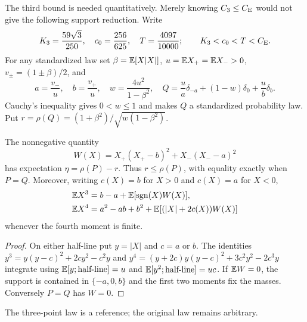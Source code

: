 The third bound is needed quantitatively.  Merely knowing $C_3\le C_{\mathrm E}$
would not give the following support reduction.
Write
\[
 K_3=\frac{59\sqrt3}{250},\quad c_0=\frac{256}{625},\quad
 T=\frac{4097}{10000};\qquad K_3<c_0<T<C_{\mathrm E}.
\]
For any standardized law set
$\beta=\mathbb E[X|X|]$, $u=\mathbb E X_+=\mathbb E X_->0$,
$v_\pm=(1\pm\beta)/2$, and
\begin{equation}\label{j:finite:n4-reference}
 a=\frac{v_-}{u},\quad b=\frac{v_+}{u},\quad
 w=\frac{4u^2}{1-\beta^2},\quad
 Q=\frac ua\delta_{-a}+(1-w)\delta_0+\frac ub\delta_b.
\end{equation}
Cauchy's inequality gives $0<w\le1$ and makes $Q$ a standardized
probability law.  Put $r=\rho(Q)=(1+\beta^2)/\sqrt{w(1-\beta^2)}$.
\begin{lemma}\label{j:finite:n4-excess}
The nonnegative quantity
\[
 W(X)=X_+(X_+-b)^2+X_-(X_--a)^2
\]
has expectation $\eta=\rho(P)-r$.  Thus $r\le\rho(P)$, with
equality exactly when $P=Q$.  Moreover, writing $c(X)=b$ for $X>0$
and $c(X)=a$ for $X<0$,
\begin{align}
 \mathbb E X^3&=b-a+\mathbb E[\operatorname{sgn}(X)W(X)],\notag\\
 \mathbb E X^4&=a^2-ab+b^2+\mathbb E[(|X|+2c(X))W(X)]
 \label{j:finite:n4-physical-moments}
\end{align}
whenever the fourth moment is finite.
\end{lemma}
\begin{proof}
On either half-line put $y=|X|$ and $c=a$ or $b$.  The identities
$y^3=y(y-c)^2+2cy^2-c^2y$ and
$y^4=(y+2c)y(y-c)^2+3c^2y^2-2c^3y$ integrate using
$\mathbb E[y;\text{half-line}]=u$ and
$\mathbb E[y^2;\text{half-line}]=uc$.
If $\mathbb E W=0$, the support is contained in $\{-a,0,b\}$ and the
first two moments fix the masses.  Conversely $P=Q$ has $W=0$.
\end{proof}
The three-point law is a reference;
the original law remains arbitrary.

